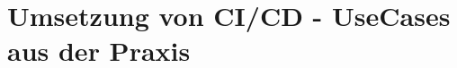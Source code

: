 \section{Umsetzung von CI/CD - UseCases aus der Praxis}
\label{Umsetzung von CI/CD - UseCases aus der Praxis}